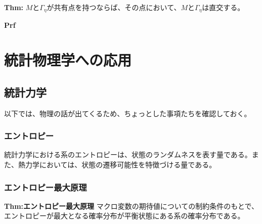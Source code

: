 \documentclass[a4paper,11pt]{jsarticle}
\numberwithin{equation}{section}
\begin{document}
\begin{itembox}[l]{\textbf{Thm:}}
    $M$と$\Gamma_{\eta}$が共有点を持つならば、その点において、$M$と$\Gamma_{\eta}$は直交する。
\end{itembox}
\textbf{Prf}\\

\section{統計物理学への応用}
\subsection{統計力学}
以下では、物理の話が出てくるため、ちょっとした事項たちを確認しておく。

\subsubsection{エントロピー}
統計力学における系のエントロピーは、状態のランダムネスを表す量である。また、熱力学においては、状態の遷移可能性を特徴づける量である。
\subsubsection{エントロピー最大原理}
\begin{itembox}[l]{\textbf{Thm:エントロピー最大原理}}
    マクロ変数の期待値についての制約条件のもとで、エントロピーが最大となる確率分布が平衡状態にある系の確率分布である。
\end{itembox}
\end{document}

